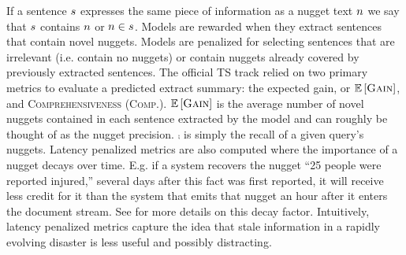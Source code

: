 If a sentence $s$ 
expresses the same piece of information as a nugget text $n$ 
we say that $s$ contains $n$ or $n \in s$.
Models are rewarded when they extract sentences that contain 
novel nuggets. Models are penalized for 
selecting sentences that are irrelevant (i.e. contain no nuggets) or 
contain nuggets already covered by previously extracted sentences. 
   The official TS track relied on two primary metrics to 
evaluate a predicted extract summary: 
the expected gain, or $\mathbb{E}\left[\textsc{Gain}\right]$, and 
\textsc{Comprehensiveness} (\textsc{Comp.}).
$\mathbb{E}\left[\textsc{Gain}\right]$ is the average number of novel nuggets contained in each
sentence extracted by the model and can roughly be thought of as the 
nugget precision. $\comp$ is simply the recall of a given query's nuggets.
% 
Latency penalized metrics are also computed where
the importance of a nugget decays over time. E.g. if a system
recovers the nugget ``25 people were reported injured,'' several days
after this fact was first reported, it will receive less credit for it
than the system that emits that nugget an hour after it enters the 
document stream. See \cite{aslam2014trec} for more details on this decay 
factor. Intuitively, latency penalized metrics capture the idea that stale
information in a rapidly evolving disaster is less useful and possibly
distracting.

